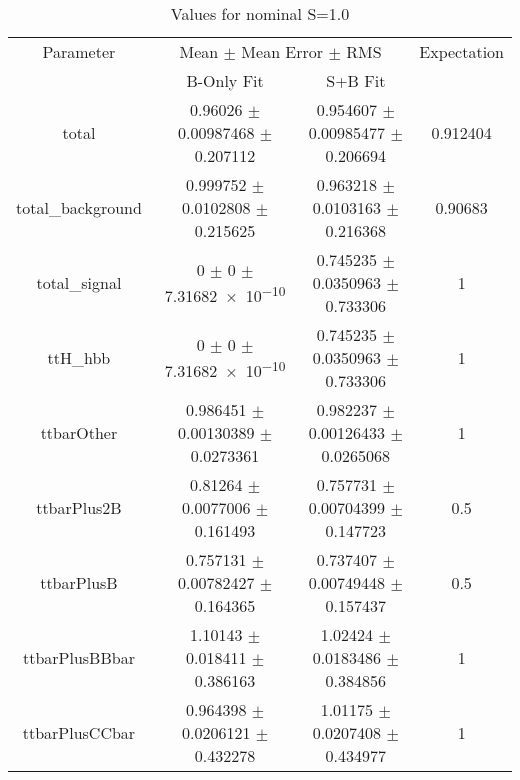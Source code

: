 \begin{table}
\centering
\caption{Values for nominal S=1.0}
\begin{tabular}{cccc}
\toprule
Parameter & \multicolumn{2}{c}{Mean $\pm$ Mean Error $\pm$ RMS} & Expectation\\
 & B-Only Fit & S+B Fit & \\
\midrule
total & \num{0.96026} $\pm$ \num{0.00987468} $\pm$ \num{0.207112} & \num{0.954607} $\pm$ \num{0.00985477} $\pm$ \num{0.206694} & \num{0.912404}\\
total\_background & \num{0.999752} $\pm$ \num{0.0102808} $\pm$ \num{0.215625} & \num{0.963218} $\pm$ \num{0.0103163} $\pm$ \num{0.216368} & \num{0.90683}\\
total\_signal & \num{0} $\pm$ \num{0} $\pm$ \num{7.31682e-10} & \num{0.745235} $\pm$ \num{0.0350963} $\pm$ \num{0.733306} & \num{1}\\
ttH\_hbb & \num{0} $\pm$ \num{0} $\pm$ \num{7.31682e-10} & \num{0.745235} $\pm$ \num{0.0350963} $\pm$ \num{0.733306} & \num{1}\\
ttbarOther & \num{0.986451} $\pm$ \num{0.00130389} $\pm$ \num{0.0273361} & \num{0.982237} $\pm$ \num{0.00126433} $\pm$ \num{0.0265068} & \num{1}\\
ttbarPlus2B & \num{0.81264} $\pm$ \num{0.0077006} $\pm$ \num{0.161493} & \num{0.757731} $\pm$ \num{0.00704399} $\pm$ \num{0.147723} & \num{0.5}\\
ttbarPlusB & \num{0.757131} $\pm$ \num{0.00782427} $\pm$ \num{0.164365} & \num{0.737407} $\pm$ \num{0.00749448} $\pm$ \num{0.157437} & \num{0.5}\\
ttbarPlusBBbar & \num{1.10143} $\pm$ \num{0.018411} $\pm$ \num{0.386163} & \num{1.02424} $\pm$ \num{0.0183486} $\pm$ \num{0.384856} & \num{1}\\
ttbarPlusCCbar & \num{0.964398} $\pm$ \num{0.0206121} $\pm$ \num{0.432278} & \num{1.01175} $\pm$ \num{0.0207408} $\pm$ \num{0.434977} & \num{1}\\
\bottomrule
\end{tabular}
\end{table}